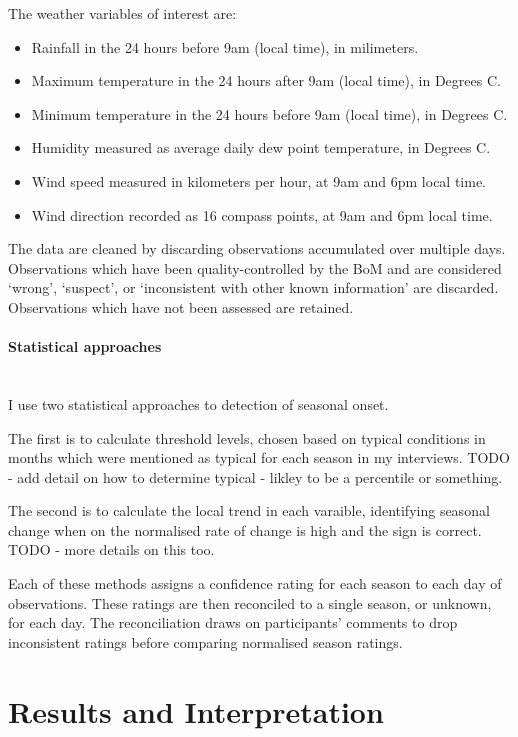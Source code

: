 The weather variables of interest are:
\begin{itemize}
\item Rainfall in the 24 hours before 9am (local time), in milimeters.
\item Maximum temperature in the 24 hours after 9am (local time), in Degrees C.
\item Minimum temperature in the 24 hours before 9am (local time), in Degrees C.
\item Humidity measured as average daily dew point temperature, in Degrees C.
\item Wind speed measured in kilometers per hour, at 9am and 6pm local time.
\item Wind direction recorded as 16 compass points, at 9am and 6pm local time.
\end{itemize}

The data are cleaned by discarding observations accumulated over multiple days.
Observations which have been quality-controlled by the BoM and are considered
`wrong', `suspect', or `inconsistent with other known information' are discarded.
Observations which have not been assessed are retained.


\paragraph{Statistical approaches}~\\
I use two statistical approaches to detection of seasonal onset.

The first is to calculate threshold levels, chosen based on typical conditions
in months which were mentioned as typical for each season in my interviews.
TODO - add detail on how to determine typical - likley to be a percentile or something.

The second is to calculate the local trend in each varaible, identifying seasonal
change when on the normalised rate of change is high and the sign is correct.
TODO - more details on this too.

Each of these methods assigns a confidence rating for each season to each day of
observations.  These ratings are then reconciled to a single season, or unknown,
for each day.  The reconciliation draws on participants' comments to drop inconsistent
ratings before comparing normalised season ratings.




\section{Results and Interpretation}

